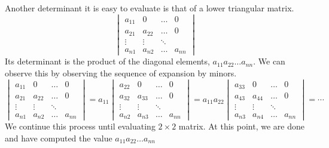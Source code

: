 \documentclass[../main.tex]{subfiles}
\begin{document}
Another determinant it is easy to evaluate is that of a lower triangular matrix.
\begin{equation*}
  \begin{vmatrix}
    a_{11} & 0 & \hdots & 0\\
	a_{21} & a_{22} & \hdots & 0\\
	\vdots & \vdots & \ddots & \\
	a_{n1} & a_{n2} & \hdots & a_{nn}
  \end{vmatrix}
\end{equation*}
Its determinant is the product of the diagonal elements, \(a_{11}a_{22} \hdots a_{nn}\). We can observe this by observing the sequence of expansion by minors.
\begin{equation*}
  \begin{vmatrix}
    a_{11} & 0 & \hdots & 0\\
	a_{21} & a_{22} & \hdots & 0\\
	\vdots & \vdots & \ddots & \\
	a_{n1} & a_{n2} & \hdots & a_{nn}
  \end{vmatrix}
  =a_{11}
  \begin{vmatrix}
    a_{22} & 0 & \hdots & 0\\
	a_{32} & a_{33} & \hdots & 0\\
	\vdots & \vdots & \ddots & \\
	a_{n2} & a_{n3} & \hdots & a_{nn}
  \end{vmatrix}
  =a_{11}a_{22}
  \begin{vmatrix}
    a_{33} & 0 & \hdots & 0\\
	a_{43} & a_{44} & \hdots & 0\\
	\vdots & \vdots & \ddots & \\
	a_{n3} & a_{n4} & \hdots & a_{nn}
  \end{vmatrix}
  =\cdots
\end{equation*}
We continue this process until evaluating \(2 \times 2\) matrix. At this point, we are done and have computed the value \(a_{11}a_{22} \hdots a_{nn}\)
\end{document}

